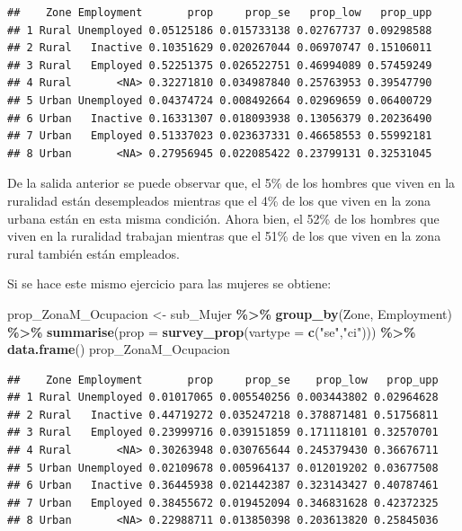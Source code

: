 \documentclass[
  spanish,
  12pt,
]{book}
\newenvironment{Shaded}{\begin{snugshade}}{\end{snugshade}}
\newcommand{\AttributeTok}[1]{\textcolor[rgb]{0.13,0.29,0.53}{#1}}
\newcommand{\FunctionTok}[1]{\textcolor[rgb]{0.13,0.29,0.53}{\textbf{#1}}}
\newcommand{\NormalTok}[1]{#1}
\newcommand{\OtherTok}[1]{\textcolor[rgb]{0.56,0.35,0.01}{#1}}
\newcommand{\SpecialCharTok}[1]{\textcolor[rgb]{0.81,0.36,0.00}{\textbf{#1}}}
\newcommand{\StringTok}[1]{\textcolor[rgb]{0.31,0.60,0.02}{#1}}
\begin{document}
\begin{verbatim}
##    Zone Employment       prop     prop_se   prop_low   prop_upp
## 1 Rural Unemployed 0.05125186 0.015733138 0.02767737 0.09298588
## 2 Rural   Inactive 0.10351629 0.020267044 0.06970747 0.15106011
## 3 Rural   Employed 0.52251375 0.026522751 0.46994089 0.57459249
## 4 Rural       <NA> 0.32271810 0.034987840 0.25763953 0.39547790
## 5 Urban Unemployed 0.04374724 0.008492664 0.02969659 0.06400729
## 6 Urban   Inactive 0.16331307 0.018093938 0.13056379 0.20236490
## 7 Urban   Employed 0.51337023 0.023637331 0.46658553 0.55992181
## 8 Urban       <NA> 0.27956945 0.022085422 0.23799131 0.32531045
\end{verbatim}

De la salida anterior se puede observar que, el 5\% de los hombres que viven en la ruralidad están desempleados mientras que el 4\% de los que viven en la zona urbana están en esta misma condición. Ahora bien, el 52\% de los hombres que viven en la ruralidad trabajan mientras que el 51\% de los que viven en la zona rural también están empleados.

Si se hace este mismo ejercicio para las mujeres se obtiene:

\begin{Shaded}
\begin{Highlighting}[]
\NormalTok{prop\_ZonaM\_Ocupacion }\OtherTok{\textless{}{-}}\NormalTok{ sub\_Mujer }\SpecialCharTok{\%\textgreater{}\%} 
                        \FunctionTok{group\_by}\NormalTok{(Zone, Employment) }\SpecialCharTok{\%\textgreater{}\%} 
                        \FunctionTok{summarise}\NormalTok{(}\AttributeTok{prop =} \FunctionTok{survey\_prop}\NormalTok{(}\AttributeTok{vartype =} \FunctionTok{c}\NormalTok{(}\StringTok{"se"}\NormalTok{,}\StringTok{"ci"}\NormalTok{))) }\SpecialCharTok{\%\textgreater{}\%}
                        \FunctionTok{data.frame}\NormalTok{()}
\NormalTok{prop\_ZonaM\_Ocupacion}
\end{Highlighting}
\end{Shaded}

\begin{verbatim}
##    Zone Employment       prop     prop_se    prop_low   prop_upp
## 1 Rural Unemployed 0.01017065 0.005540256 0.003443802 0.02964628
## 2 Rural   Inactive 0.44719272 0.035247218 0.378871481 0.51756811
## 3 Rural   Employed 0.23999716 0.039151859 0.171118101 0.32570701
## 4 Rural       <NA> 0.30263948 0.030765644 0.245379430 0.36676711
## 5 Urban Unemployed 0.02109678 0.005964137 0.012019202 0.03677508
## 6 Urban   Inactive 0.36445938 0.021442387 0.323143427 0.40787461
## 7 Urban   Employed 0.38455672 0.019452094 0.346831628 0.42372325
## 8 Urban       <NA> 0.22988711 0.013850398 0.203613820 0.25845036
\end{verbatim}
\end{document}
